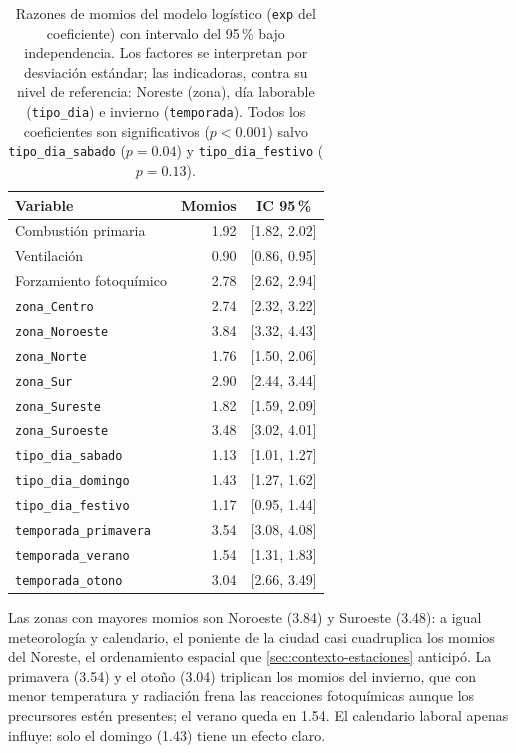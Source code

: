 \begin{table}[t]
  \centering
  \caption{Razones de momios del modelo logístico (\texttt{exp} del
    coeficiente) con intervalo del 95\,\% bajo independencia. Los factores se
    interpretan por desviación estándar; las indicadoras, contra su nivel de
    referencia: Noreste (zona), día laborable (\texttt{tipo\_dia}) e
    invierno (\texttt{temporada}). Todos los coeficientes son significativos
    ($p<0.001$) salvo \texttt{tipo\_dia\_sabado} ($p=0.04$) y
    \texttt{tipo\_dia\_festivo} ($p=0.13$).}
  \label{tab:momios-log}
  \small
  \begin{tabular}{lrc}
    \toprule
    Variable & Momios & IC 95\,\% \\
    \midrule
    Combustión primaria     & 1.92 & [1.82, 2.02] \\
    Ventilación             & 0.90 & [0.86, 0.95] \\
    Forzamiento fotoquímico & 2.78 & [2.62, 2.94] \\
    \midrule
    \texttt{zona\_Centro}    & 2.74 & [2.32, 3.22] \\
    \texttt{zona\_Noroeste}  & 3.84 & [3.32, 4.43] \\
    \texttt{zona\_Norte}     & 1.76 & [1.50, 2.06] \\
    \texttt{zona\_Sur}       & 2.90 & [2.44, 3.44] \\
    \texttt{zona\_Sureste}   & 1.82 & [1.59, 2.09] \\
    \texttt{zona\_Suroeste}  & 3.48 & [3.02, 4.01] \\
    \midrule
    \texttt{tipo\_dia\_sabado}  & 1.13 & [1.01, 1.27] \\
    \texttt{tipo\_dia\_domingo} & 1.43 & [1.27, 1.62] \\
    \texttt{tipo\_dia\_festivo} & 1.17 & [0.95, 1.44] \\
    \midrule
    \texttt{temporada\_primavera} & 3.54 & [3.08, 4.08] \\
    \texttt{temporada\_verano}    & 1.54 & [1.31, 1.83] \\
    \texttt{temporada\_otono}     & 3.04 & [2.66, 3.49] \\
    \bottomrule
  \end{tabular}
\end{table}

Las zonas con mayores momios son Noroeste (3.84) y Suroeste (3.48): a igual
meteorología y calendario, el poniente de la ciudad casi cuadruplica los
momios del Noreste, el ordenamiento espacial que
\cref{sec:contexto-estaciones} anticipó. La primavera (3.54) y el otoño
(3.04) triplican los momios del invierno, que con menor temperatura y
radiación frena las reacciones fotoquímicas aunque los precursores estén
presentes; el verano queda en 1.54. El calendario laboral apenas influye:
solo el domingo (1.43) tiene un efecto claro.


